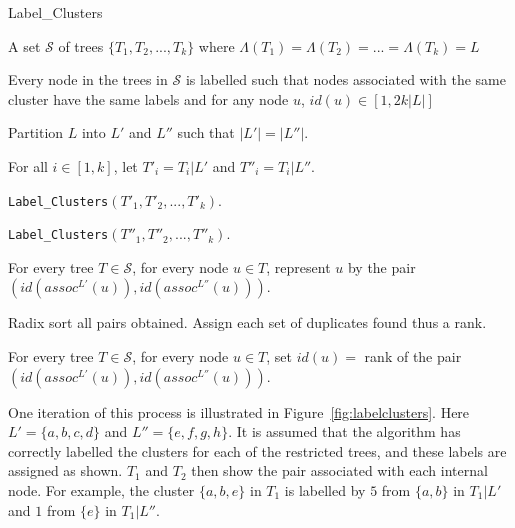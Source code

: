 \documentclass{article}
\newcommand{\leafset}{\Lambda}
\begin{document}
    \begin{algorithm}
        \caption{Label\_Clusters}
        \label{alg:labelclusters}

        \begin{algorithmic}[1]
            \Input A set $\mathcal{S}$ of trees $\{T_1, T_2, ..., T_k\}$ where $\leafset(T_1) = \leafset(T_2) = ... = \leafset(T_k) = L$

            \Output Every node in the trees in $\mathcal{S}$ is labelled such that nodes associated with the same cluster have the same labels and for any node $u$, $id(u) \in [1, 2k |L|]$

            \State Partition $L$ into $L'$ and $L''$ such that $|L'| = |L''|$.

            \State For all $i \in [1,k]$, let $T'_i = T_i|L'$ and $T''_i = T_i|L''$.

            \State \texttt{Label\_Clusters}$(T'_1, T'_2, ..., T'_k)$.

            \State \texttt{Label\_Clusters}$(T''_1, T''_2, ..., T''_k)$.

            \State For every tree $T \in \mathcal{S}$, for every node $u \in T$, represent $u$ by the pair $(id(assoc^{L'}(u)), id(assoc^{L''}(u)))$.

            \State Radix sort all pairs obtained. Assign each set of duplicates found thus a rank.

            \State For every tree $T \in \mathcal{S}$, for every node $u \in T$, set $id(u) = $ rank of the pair $(id(assoc^{L'}(u)), id(assoc^{L''}(u)))$.
        \end{algorithmic}
    \end{algorithm}

    One iteration of this process is illustrated in Figure~\ref{fig:labelclusters}. Here $L' = \{a, b, c, d\}$ and $L'' = \{e, f, g, h\}$. It is assumed that the algorithm has correctly labelled the clusters for each of the restricted trees, and these labels are assigned as shown. $T_1$ and $T_2$ then show the pair associated with each internal node. For example, the cluster $\{a, b, e\}$ in $T_1$ is labelled by $5$ from $\{a, b\}$ in $T_1|L'$ and $1$ from $\{e\}$ in $T_1|L''$.
\end{document}
